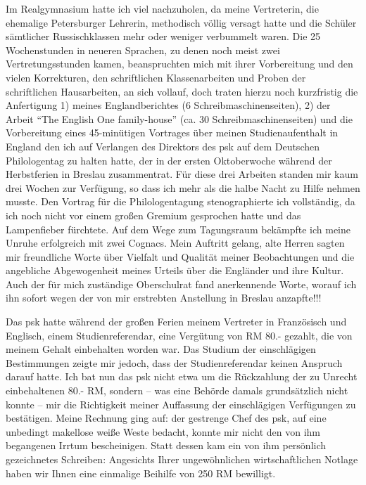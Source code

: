 Im Realgymnasium hatte ich viel nachzuholen, da meine Vertreterin, die ehemalige Petersburger Lehrerin, methodisch völlig versagt hatte und die Schüler sämtlicher Russischklassen mehr oder weniger verbummelt waren. Die 25 Wochenstunden in neueren Sprachen, zu denen noch meist zwei Vertretungsstunden kamen, beanspruchten mich mit ihrer Vorbereitung und den vielen Korrekturen, den schriftlichen Klassenarbeiten und Proben der schriftlichen Hausarbeiten, an sich vollauf, doch traten hierzu noch kurzfristig die Anfertigung 1) meines Englandberichtes (6 Schreibmaschinenseiten), 2) der Arbeit \enquote{The English One family-house} (ca. 30 Schreibmaschinenseiten) und die Vorbereitung eines 45-minütigen Vortrages über meinen Studienaufenthalt in England den ich auf Verlangen des Direktors des \ac{psk} auf dem Deutschen Philologentag zu halten hatte, der in der ersten Oktoberwoche während der Herbstferien in Breslau zusammentrat. Für diese drei Arbeiten standen mir kaum drei Wochen zur Verfügung, so dass ich mehr als die halbe Nacht zu Hilfe nehmen musste. Den Vortrag für die Philologentagung stenographierte ich vollständig, da ich noch nicht vor einem großen Gremium gesprochen hatte und das Lampenfieber fürchtete. Auf dem Wege zum Tagungsraum bekämpfte ich meine Unruhe erfolgreich mit zwei Cognacs. Mein Auftritt gelang, alte Herren sagten mir freundliche Worte über Vielfalt und Qualität meiner Beobachtungen und die angebliche Abgewogenheit meines Urteils über die Engländer und ihre Kultur. Auch der für mich zuständige Oberschulrat fand anerkennende Worte, worauf ich ihn sofort wegen der von mir erstrebten Anstellung in Breslau anzapfte!!!

Das \ac{psk} hatte während der großen Ferien meinem Vertreter in Französisch und Englisch, einem Studienreferendar, eine Vergütung von RM 80.- gezahlt, die von meinem Gehalt einbehalten worden war. Das Studium der einschlägigen Bestimmungen zeigte mir jedoch, dass der Studienreferendar keinen Anspruch darauf hatte. Ich bat nun das \ac{psk} nicht etwa um die Rückzahlung der zu Unrecht einbehaltenen 80.- RM, sondern -- was eine Behörde damals grundsätzlich nicht konnte -- mir die Richtigkeit meiner Auffassung der einschlägigen Verfügungen zu bestätigen. Meine Rechnung ging auf: der gestrenge Chef des \ac{psk}, auf eine unbedingt makellose weiße Weste bedacht, konnte mir nicht den von ihm begangenen Irrtum bescheinigen. Statt dessen kam ein von ihm persönlich gezeichnetes Schreiben: Angesichts Ihrer ungewöhnlichen wirtschaftlichen Notlage haben wir Ihnen eine einmalige Beihilfe von 250 RM bewilligt.

